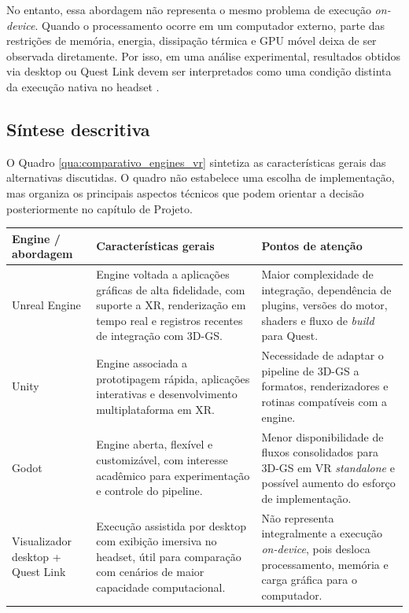 No entanto, essa abordagem não representa o mesmo problema de execução \textit{on-device}. Quando o processamento ocorre em um computador externo, parte das restrições de memória, energia, dissipação térmica e GPU móvel deixa de ser observada diretamente. Por isso, em uma análise experimental, resultados obtidos via desktop ou Quest Link devem ser interpretados como uma condição distinta da execução nativa no headset \cite{metaquest3s2024,qualcommxr2gen2,xu2023}.

\subsection{Síntese descritiva}

O Quadro \ref{qua:comparativo_engines_vr} sintetiza as características gerais das alternativas discutidas. O quadro não estabelece uma escolha de implementação, mas organiza os principais aspectos técnicos que podem orientar a decisão posteriormente no capítulo de Projeto.

\begin{quadro}[H]
\centering
\caption{Síntese descritiva de engines e abordagens para integração em VR}
\label{qua:comparativo_engines_vr}
\footnotesize
\renewcommand{\arraystretch}{1.2}
\begin{tabularx}{\textwidth}{|>{\raggedright\arraybackslash}p{3.2cm}|>{\raggedright\arraybackslash}X|>{\raggedright\arraybackslash}X|}
\hline
\textbf{Engine / abordagem} & \textbf{Características gerais} & \textbf{Pontos de atenção} \\ \hline
Unreal Engine & Engine voltada a aplicações gráficas de alta fidelidade, com suporte a XR, renderização em tempo real e registros recentes de integração com 3D-GS. & Maior complexidade de integração, dependência de plugins, versões do motor, shaders e fluxo de \textit{build} para Quest. \\ \hline
Unity & Engine associada a prototipagem rápida, aplicações interativas e desenvolvimento multiplataforma em XR. & Necessidade de adaptar o pipeline de 3D-GS a formatos, renderizadores e rotinas compatíveis com a engine. \\ \hline
Godot & Engine aberta, flexível e customizável, com interesse acadêmico para experimentação e controle do pipeline. & Menor disponibilidade de fluxos consolidados para 3D-GS em VR \textit{standalone} e possível aumento do esforço de implementação. \\ \hline
Visualizador desktop + Quest Link & Execução assistida por desktop com exibição imersiva no headset, útil para comparação com cenários de maior capacidade computacional. & Não representa integralmente a execução \textit{on-device}, pois desloca processamento, memória e carga gráfica para o computador. \\ \hline
\end{tabularx}
\end{quadro}

